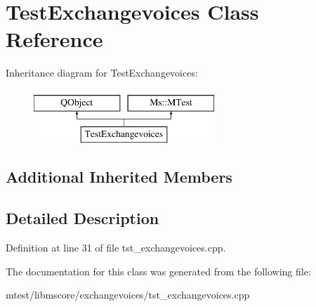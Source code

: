 \hypertarget{class_test_exchangevoices}{}\section{Test\+Exchangevoices Class Reference}
\label{class_test_exchangevoices}
Inheritance diagram for Test\+Exchangevoices\+:\begin{figure}[H]
\begin{center}
\leavevmode
\includegraphics[height=2.000000cm]{class_test_exchangevoices}
\end{center}
\end{figure}
\subsection*{Additional Inherited Members}


\subsection{Detailed Description}


Definition at line 31 of file tst\+\_\+exchangevoices.\+cpp.



The documentation for this class was generated from the following file\+:\begin{DoxyCompactItemize}
\item 
mtest/libmscore/exchangevoices/tst\+\_\+exchangevoices.\+cpp\end{DoxyCompactItemize}
